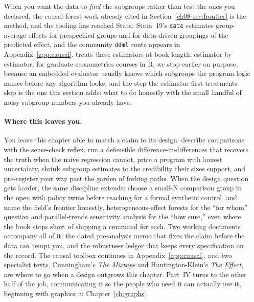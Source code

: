 \documentclass[
    a4paper,
    fontsize=10pt,
    twoside=true,
    numbers=noenddot,
]{kaobook}
\begin{document}
When you want the data to \emph{find} the subgroups rather than test the ones you declared, the causal-forest work already cited in Section~\ref{ch08-sec:frontier} is the method, and the tooling has reached Stata: Stata~19's \texttt{cate} estimates group-average effects for prespecified groups and for data-driven groupings of the predicted effect, and the community \texttt{ddml} route appears in Appendix~\ref{app:causal}. \textcite{huber2023causal} treats these estimators at book length, estimator by estimator, for graduate econometrics courses in R; we stop earlier on purpose, because an embedded evaluator usually knows which subgroups the program logic names before any algorithm looks, and the step the estimator-first treatments skip is the one this section adds: what to do honestly with the small handful of noisy subgroup numbers you already have.

\paragraph{Where this leaves you.} You leave this chapter able to match a claim to its design: describe comparisons with the sense-check reflex, run a defensible difference-in-differences that recovers the truth when the naive regression cannot, price a program with honest uncertainty, shrink subgroup estimates to the credibility their sizes support, and pre-register your way past the garden of forking paths. When the design question gets harder, the same discipline extends: choose a small-N comparison group in the open with policy twins before reaching for a formal synthetic control, and name the field's frontier honestly, heterogeneous-effect forests for the \enquote{for whom} question and parallel-trends sensitivity analysis for the \enquote{how sure,} even where the book stops short of shipping a command for each. Two working documents accompany all of it: the dated pre-analysis memo that fixes the claim before the data can tempt you, and the robustness ledger that keeps every specification on the record. The causal toolbox continues in Appendix~\ref{app:causal}, and two specialist texts, Cunningham's \emph{The Mixtape} and Huntington-Klein's \emph{The Effect}, are where to go when a design outgrows this chapter. Part~IV turns to the other half of the job, communicating it so the people who need it can actually use it, beginning with graphics in Chapter~\ref{ch:graphs}.
\end{document}
